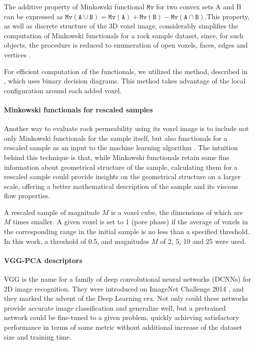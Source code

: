 \documentclass[review]{elsarticle}
\begin{document}
The additive property of Minkowski functional $\mathtt{Mv}$ for two convex sets A and B can be expressed as $\mathtt{Mv (A \cup B) = Mv (A) + Mv (B) - Mv (A \cap B)}$.This property, as well as discrete structure of the 3D voxel image, considerably simplifies the computation of Minkowski functionals for a rock sample dataset, since, for such objects, the procedure is reduced to enumeration of open voxels, faces, edges and vertices \cite{blasquez2003efficient}.

For efficient computation of the functionals, we utilized the method, described in \cite{blasquez2003efficient}, which uses binary decision diagrams. This method takes advantage of the local configuration around each added voxel.

\paragraph{Minkowski functionals for rescaled samples}

Another way to evaluate rock permeability using its voxel image is to include not only Minkowski functionals for the sample itself, but also functionals for a rescaled sample as an input to the machine learning algorithm \cite{srisutthiyakorn2016deep}. The intuition behind this technique is that, while Minkowski functionals retain some fine information about geometrical structure of the sample, calculating them for a rescaled sample could provide insights on the geometrical structure on a larger scale, offering a better mathematical description of the sample and its viscous flow properties.

A rescaled sample of magnitude $M$ is a voxel cube, the dimensions of which are $M$ times smaller. A given voxel is set to 1 (pore phase) if the average of voxels in the corresponding range in the initial sample is no less than a specified threshold. In this work, a threshold of 0.5, and magnitudes $M$ of 2, 5, 10 and 25 were used.

\paragraph{VGG-PCA descriptors}

VGG is the name for a family of deep convolutional neural networks (DCNNs) for 2D image recognition. They were introduced on ImageNet Challenge 2014 \cite{simonyan2014very}, and they marked the advent of the Deep Learning era. Not only could these networks provide accurate image classification and generalize well, but a pretrained network could be fine-tuned to a given problem, quickly achieving satisfactory performance in terms of some metric without additional increase of the dataset size and training time.
\end{document}
